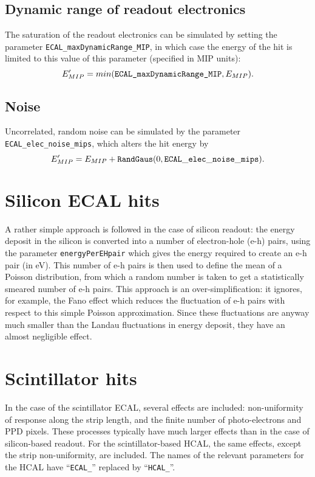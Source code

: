 \documentclass[12pt]{article} %
\begin{document}
\subsection{Dynamic range of readout electronics}
The saturation of the readout electronics can be simulated by setting the parameter {\tt ECAL\_maxDynamicRange\_MIP},
in which case the energy of the hit is limited to this value of this parameter (specified in MIP units):
\begin{equation*}
E'_{MIP} = min ( \text{\tt ECAL\_maxDynamicRange\_MIP}, E_{MIP} ).
\end{equation*}

\subsection{Noise}
Uncorrelated, random noise can be simulated by the parameter {\tt ECAL\_elec\_noise\_mips}, which
alters the hit energy by
\begin{equation*}
E'_{MIP} = E_{MIP} + \text{\tt RandGaus} ( 0, {\tt ECAL\_elec\_noise\_mips} ).
\end{equation*}

\section{Silicon ECAL hits}

A rather simple approach is followed in the case of silicon readout: 
the energy deposit in the silicon is converted into a number of electron-hole (e-h) pairs,
using the parameter {\tt energyPerEHpair} which gives the energy required to create an e-h pair (in eV).
This number of e-h pairs is then used to define the mean of a Poisson distribution, from which a random number is taken 
to get a statistically smeared number of e-h pairs. 
This approach is an over-simplification: it ignores, for example, the Fano
effect which reduces the fluctuation of e-h pairs with respect to this simple Poisson approximation.
Since these fluctuations are anyway much smaller than the Landau fluctuations in energy deposit, 
they have an almost negligible effect.

\section{Scintillator hits}

In the case of the scintillator ECAL, several effects are included: non-uniformity of response along the strip length,
and the finite number of photo-electrons and PPD pixels. 
These processes typically have much larger effects than in the case of silicon-based readout.
For the scintillator-based HCAL, the same effects, except the strip non-uniformity, are included. 
The names of the relevant parameters for the HCAL have ``{\tt ECAL\_}'' replaced by ``{\tt HCAL\_}''.
\end{document}
